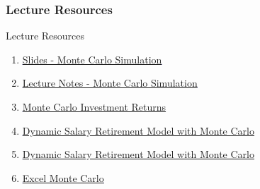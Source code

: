 \documentclass[handout, 11pt]{beamer}
\begin{document}
\appendix
{}
\setcounter{finalframe}{\value{framenumber}}
\begin{frame}
\frametitle{Lecture Resources}
{
\begin{block}{Lecture Resources}
\begin{enumerate}
\item \textcolor{blue}{\underline{\href{https://nickderobertis.github.io/fin-model-course/\_static/generated/pdfs/S10 Monte Carlo Simulation.pdf}{Slides - Monte Carlo Simulation}}}
\item \textcolor{blue}{\underline{\href{https://nickderobertis.github.io/fin-model-course/\_static/generated/pdfs/LN10 Monte Carlo Simulation.pdf}{Lecture Notes - Monte Carlo Simulation}}}
\item \textcolor{blue}{\underline{\href{https://nickderobertis.github.io/fin-model-course/\_static/Examples/Monte Carlo/Python/MC Investment Returns.ipynb}{Monte Carlo Investment Returns}}}
\item \textcolor{blue}{\underline{\href{https://nickderobertis.github.io/fin-model-course/\_static/Examples/Monte Carlo/Python/Dynamic Salary Retirement Model Monte Carlo.ipynb}{Dynamic Salary Retirement Model with Monte Carlo}}}
\item \textcolor{blue}{\underline{\href{https://nickderobertis.github.io/fin-model-course/\_static/Examples/Monte Carlo/Excel/Dynamic Salary Retirement Model with Monte Carlo.xlsx}{Dynamic Salary Retirement Model with Monte Carlo}}}
\item \textcolor{blue}{\underline{\href{https://nickderobertis.github.io/fin-model-course/\_static/Examples/Monte Carlo/Excel/Excel Monte Carlo.ipynb}{Excel Monte Carlo}}}
\end{enumerate}
\vfill
\end{block}
}
\label{frames:resources}
\end{frame}
\end{document}
